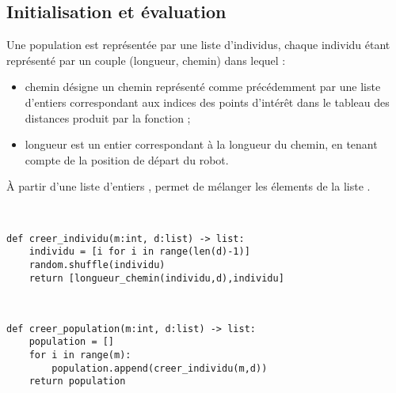 \fi

\subsection{Initialisation et évaluation}

\ifprof
\else
Une population est représentée par une liste d’individus, chaque individu étant représenté par un couple (longueur,
chemin) dans lequel :
\begin{itemize}
\item chemin désigne un chemin représenté comme précédemment par une liste d’entiers correspondant aux indices
des points d’intérêt dans le tableau des distances produit par la fonction ;
\item longueur est un entier correspondant à la longueur du chemin, en tenant compte de la position de départ du
robot.
\end{itemize}

À partir d'une liste d'entiers ,  permet de mélanger les élements de la liste 
.
\fi

\ifprof
\begin{corrige}~\\ \vspace{-.7cm}
\begin{lstlisting}
def creer_individu(m:int, d:list) -> list:
    individu = [i for i in range(len(d)-1)]
    random.shuffle(individu)
    return [longueur_chemin(individu,d),individu]
\end{lstlisting}
\end{corrige}\else
\fi


\ifprof
\begin{corrige}~\\ \vspace{-.7cm}
\begin{lstlisting}
def creer_population(m:int, d:list) -> list:
    population = []
    for i in range(m):
        population.append(creer_individu(m,d))
    return population
\end{lstlisting}
\end{corrige}\else
\fi


